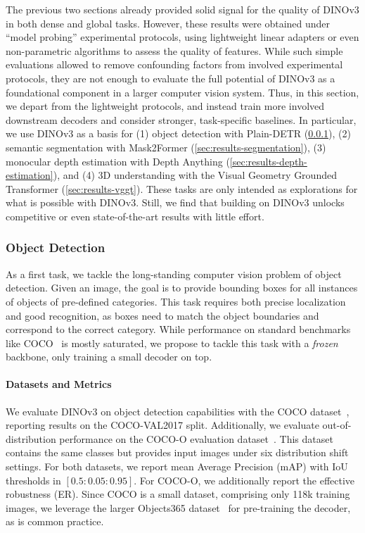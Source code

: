 The previous two sections already provided solid signal for the quality of DINOv3 in both dense and global tasks. 
However, these results were obtained under ``model probing'' experimental protocols, using lightweight linear adapters or even non-parametric algorithms to assess the quality of features.
While such simple evaluations allowed to remove confounding factors from involved experimental protocols, they are not enough to evaluate the full potential of DINOv3 as a foundational component in a larger computer vision system.
Thus, in this section, we depart from the lightweight protocols, and instead train more involved downstream decoders and consider stronger, task-specific baselines.
In particular, we use DINOv3 as a basis for 
(1) object detection with Plain-DETR (\cref{sec:results-detection}), 
(2) semantic segmentation with Mask2Former (\cref{sec:results-segmentation}), 
(3) monocular depth estimation with Depth Anything (\cref{sec:results-depth-estimation}), 
and (4) 3D understanding with the Visual Geometry Grounded Transformer (\cref{sec:results-vggt}).
These tasks are only intended as explorations for what is possible with DINOv3.
Still, we find that building on DINOv3 unlocks competitive or even state-of-the-art results with little effort.

\subsubsection{Object Detection}
\label{sec:results-detection}
As a first task, we tackle the long-standing computer vision problem of object detection.
Given an image, the goal is to provide bounding boxes for all instances of objects of pre-defined categories.
This task requires both precise localization and good recognition, as boxes need to match the object boundaries and correspond to the correct category.
While performance on standard benchmarks like COCO~\citep{Lin2014cocodataset} is mostly saturated, we propose to tackle this task with a \emph{frozen} backbone, only training a small decoder on top.

\paragraph{Datasets and Metrics}
We evaluate DINOv3 on object detection capabilities with the COCO dataset~\citep{Lin2014cocodataset}, reporting results on the COCO-VAL2017 split.
Additionally, we evaluate out-of-distribution performance on the COCO-O evaluation dataset~\citep{mao2023cocoo}. 
This dataset contains the same classes but provides input images under six distribution shift settings.
For both datasets, we report mean Average Precision (mAP) with IoU thresholds in \([0.5:0.05:0.95]\).
For COCO-O, we additionally report the effective robustness (ER).
Since COCO is a small dataset, comprising only 118k training images, we leverage the larger Objects365 dataset~\citep{shao2019objects365} for pre-training the decoder, as is common practice.

